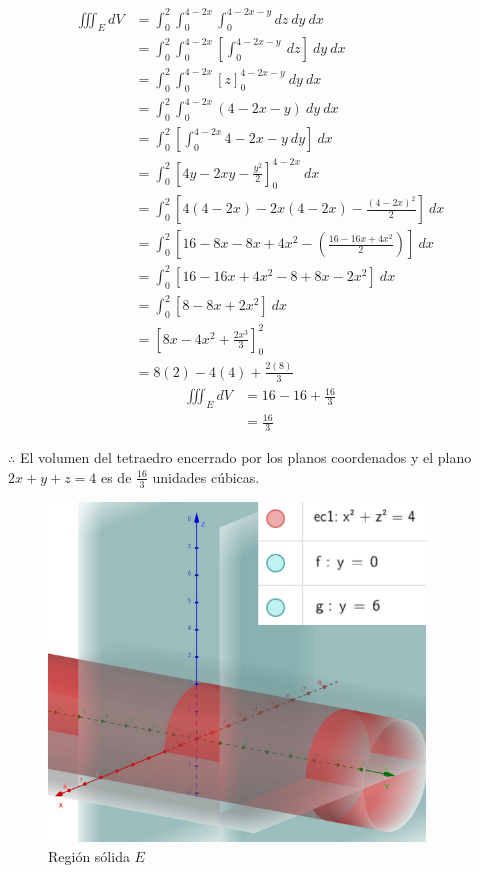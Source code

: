 \documentclass[12pt]{exam}
\begin{document}
\begin{questions}
  \begin{align*}
    \iiint_E dV 
    &= \int_0^2 \int_0^{4-2x} \int_0^{4-2x-y} dz ~ dy ~ dx \\
    &= \int_0^2 \int_0^{4-2x} \left[ \int_0^{4-2x-y} ~ dz \right] ~ dy ~ dx \\
    &= \int_0^2 \int_0^{4-2x} \left[ z \right]_0^{4-2x-y} ~ dy ~ dx \\
    &= \int_0^2 \int_0^{4-2x} (4-2x-y) ~ dy ~ dx \\
    &= \int_0^2 \left[ \int_0^{4-2x} 4-2x-y~ dy \right] ~ dx \\
    &= \int_0^2 \left[ 4y-2xy-\frac{y^2}{2} \right]_0^{4-2x} ~ dx \\ 
    &= \int_0^2 \left[ 4(4-2x)-2x(4-2x)-\frac{(4-2x)^2}{2} \right] ~ dx \\
    &= \int_0^2 \left[ 16-8x -8x+4x^2- \left(\frac{16-16x+4x^2}{2}\right) \right] ~ dx \\
    &= \int_0^2 \left[ 16-16x+4x^2-8+8x-2x^2 \right] ~ dx \\ %
    &= \int_0^2 \left[ 8-8x+2x^2 \right] ~ dx \\
    &= \left[ 8x-4x^2+\frac{2x^3}{3} \right]_0^2\\
    &= 8(2)-4(4)+\frac{2(8)}{3}  
  \end{align*}
  \begin{align*}
    \iiint_E dV 
    &= 16-16+\frac{16}{3} \\
    &= \frac{16}{3}
  \end{align*}

  $\therefore$ El volumen del tetraedro encerrado por los planos coordenados y el plano $2x+y+z=4$ es de $\frac{16}{3}$ unidades cúbicas.


  \begin{figure}[H]
    \centering
    \includegraphics[width=10cm]{../img/t2a/t2a_ej3.png}
    \caption{Región sólida $E$}
  \end{figure}
  

\end{questions}
\end{document}
